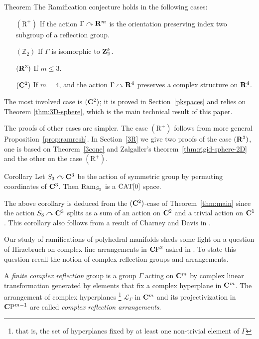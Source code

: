 \documentclass{compositio}
\begin{document}
\begin{thm}{Theorem}\label{thm:main}
The Ramification conjecture holds in the following cases:
\begin{itemize}
\item[$(\mathrm{R}^+)$] If the action $\Gamma\curvearrowright\mathbf{R}^m$ is the orientation preserving index two subgroup of a reflection group.
\item[$(\mathbb{Z}_2)$] If $\Gamma$ is isomorphic to $\mathbf{Z}_2^k$.
\item[$(\mathbf{R}^3)$]\label{3} If $m\le 3$.
\item[$(\mathbf{C}^2)$]\label{4}
If $m=4$, and the action $\Gamma\curvearrowright\mathbf{R}^4$
preserves a complex structure on $\mathbf{R}^4$.
\end{itemize}

\end{thm}

The most involved case is $(\mathbf{C}^2)$;
it is proved in Section~\ref{pkspaces} 
and relies on Theorem \ref{thm:3D-sphere},
which is the main technical result of this paper.

The proofs of other cases are simpler.
The case $(\mathrm{R}^+)$ follows from more general Proposition~\ref{prop:ramresh}.
In Section~\ref{3R}
we give two proofs of the case $(\mathbf{R}^3)$, one is based on Theorem~\ref{3cone} and Zalgaller's theorem~\ref{thm:rigid-sphere-2D}
and the other on the case $(\mathrm{R}^+)$.

\begin{thm}{Corollary}\label{cor:braid}
Let $S_3\curvearrowright\mathbf{C}^3$ be the action of symmetric group by permuting coordinates of $\mathbf{C}^3$.
Then $\mathop{\rm Ram}\nolimits_{S_3}$ is a $\mathrm{CAT}[0]$ space.
\end{thm}

The above corollary is deduced from the $(\mathbf{C}^2)$-case of Theorem~\ref{thm:main}
since the action $S_3\curvearrowright\mathbf{C}^3$ splits as a sum of an action on $\mathbf{C}^2$ and a trivial action on $\mathbf{C}^1$.
This corollary also follows from a result of Charney and Davis in \cite{charney-davis-93}.


Our study of ramifications of polyhedral manifolds sheds  some light on a question of Hirzebruch on complex line arrangements in $\mathbf{C}\mathrm{P}^2$ asked in \cite{Hirzebruch}. To state this question recall the notion of complex reflection groups and arrangements. 

A {\it finite complex reflection} group is a group $\Gamma$ acting on $\mathbf{C}^m$ by complex linear transformation generated by elements that fix a complex hyperplane in $\mathbf{C}^m$. 
The arrangement of complex hyperplanes%
\footnote{that is, the set of hyperplanes fixed by at least one non-trivial element of $\Gamma$} 
 $\mathcal{L}_\Gamma$ in $\mathbf{C}^m$ and its projectivization in $\mathbf{C}\mathrm{P}^{m-1}$ are called {\it complex reflection arrangements}.
\end{document}
